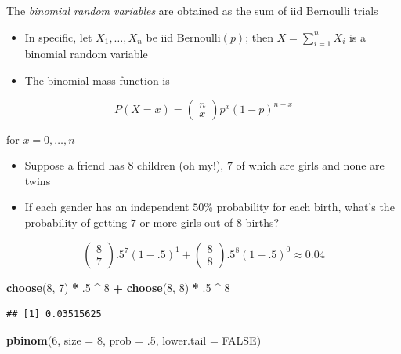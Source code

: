 \documentclass[]{article}
\newenvironment{Shaded}{\begin{snugshade}}{\end{snugshade}}
\newcommand{\DataTypeTok}[1]{\textcolor[rgb]{0.13,0.29,0.53}{#1}}
\newcommand{\DecValTok}[1]{\textcolor[rgb]{0.00,0.00,0.81}{#1}}
\newcommand{\FloatTok}[1]{\textcolor[rgb]{0.00,0.00,0.81}{#1}}
\newcommand{\KeywordTok}[1]{\textcolor[rgb]{0.13,0.29,0.53}{\textbf{#1}}}
\newcommand{\NormalTok}[1]{#1}
\newcommand{\OperatorTok}[1]{\textcolor[rgb]{0.81,0.36,0.00}{\textbf{#1}}}
\newcommand{\OtherTok}[1]{\textcolor[rgb]{0.56,0.35,0.01}{#1}}
\newcommand{\StringTok}[1]{\textcolor[rgb]{0.31,0.60,0.02}{#1}}
\begin{document}
The \emph{binomial random variables} are obtained as the sum of iid
Bernoulli trials

\begin{itemize}
\item
  In specific, let \(X_1,\ldots,X_n\) be iid Bernoulli\((p)\); then
  \(X = \sum_{i=1}^n X_i\) is a binomial random variable
\item
  The binomial mass function is
\end{itemize}

\[P(X = x) = \left(\begin{array}{c}n \\ x\end{array}\right)p^x(1 - p)^{n-x}\]

for \(x=0,\ldots,n\)

\begin{itemize}
\item
  Suppose a friend has \(8\) children (oh my!), \(7\) of which are girls
  and none are twins
\item
  If each gender has an independent \(50\)\% probability for each birth,
  what's the probability of getting \(7\) or more girls out of \(8\)
  births?
\end{itemize}

\[\left(\begin{array}{c}8 \\ 7\end{array}\right) .5^{7}(1-.5)^{1}+\left(\begin{array}{c}8 \\ 8\end{array}\right) .5^{8}(1-.5)^{0} \approx 0.04\]

\begin{Shaded}
\begin{Highlighting}[]
\KeywordTok{choose}\NormalTok{(}\DecValTok{8}\NormalTok{, }\DecValTok{7}\NormalTok{) }\OperatorTok{*}\StringTok{ }\FloatTok{.5} \OperatorTok{^}\StringTok{ }\DecValTok{8} \OperatorTok{+}\StringTok{ }\KeywordTok{choose}\NormalTok{(}\DecValTok{8}\NormalTok{, }\DecValTok{8}\NormalTok{) }\OperatorTok{*}\StringTok{ }\FloatTok{.5} \OperatorTok{^}\StringTok{ }\DecValTok{8} 
\end{Highlighting}
\end{Shaded}

\begin{verbatim}
## [1] 0.03515625
\end{verbatim}

\begin{Shaded}
\begin{Highlighting}[]
\KeywordTok{pbinom}\NormalTok{(}\DecValTok{6}\NormalTok{, }\DataTypeTok{size =} \DecValTok{8}\NormalTok{, }\DataTypeTok{prob =} \FloatTok{.5}\NormalTok{, }\DataTypeTok{lower.tail =} \OtherTok{FALSE}\NormalTok{)}
\end{Highlighting}
\end{Shaded}
\end{document}
